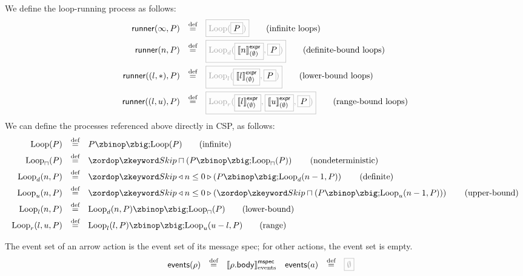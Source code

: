 \begin{definition}
We define the loop-running process as follows:
%
\begin{align*}
  \funcname{runner}(\infty, P)
  \quad\defeq\quad
  & \tlang{\iloop{\olang{P}}}
    \tag{infinite loops}
  \\
  \funcname{runner}(n, P)
  \quad\defeq\quad
  & \tlang{\dloop{\olang{\exprsema{n}{\emptyset}}}{\olang{P}}}
    \tag{definite-bound loops}
  \\
  \funcname{runner}((l, \ast), P)
  \quad\defeq\quad
  & \tlang{\lloop{\olang{\exprsema{l}{\emptyset}}}{\olang{P}}}
    \tag{lower-bound loops}
  \\
  \funcname{runner}((l, u), P)
  \quad\defeq\quad
  & \tlang{\rloop{\olang{\exprsema{l}{\emptyset}}}{\olang{\exprsema{u}{\emptyset}}}{\olang{P}}}
    \tag{range-bound loops}
  \\  
\end{align*}
%
We can define the processes referenced above directly in CSP, as follows:
%
\begin{align*}
  \iloop{P}
  \quad\defeq\quad
  & P \circseq \iloop{P}
    \tag{infinite}
  \\
  \nloop{P}
  \quad\defeq\quad
  & \Skip \sqcap \left(P \circseq \nloop{P}\right)
    \tag{nondeterministic}
  \\  
  \dloop{n}{P}
  \quad\defeq\quad
  & \Skip \triangleleft n \leq 0 \triangleright \left(P \circseq \dloop{n-1}{P}\right)
    \tag{definite}
  \\
  \uloop{n}{P}
  \quad\defeq\quad
  & \Skip \triangleleft n \leq 0 \triangleright \left(\Skip \sqcap \left(P \circseq \uloop{n-1}{P}\right)\right)
    \tag{upper-bound}
  \\
  \lloop{n}{P}
  \quad\defeq\quad
  & \dloop{n}{P} \circseq \nloop{P}
    \tag{lower-bound}
  \\
  \rloop{l}{u}{P}
  \quad\defeq\quad
  & \lloop{l}{P} \circseq \uloop{u - l}{P}
    \tag{range}
  \\
\end{align*}
\end{definition}

\begin{definition}
  The event set of an arrow action is the event set of its message spec; for
  other actions, the event set is empty.
%
  \begin{align*}
    \eventsOf{\anarrow}
    \quad\defeq\quad
    &
      \emspecsema{\field{\anarrow}{body}}
    &
      \eventsOf{\anaction}
      \quad\defeq\quad
    &
      \tlang{\emptyset}
  \end{align*}
\end{definition}

